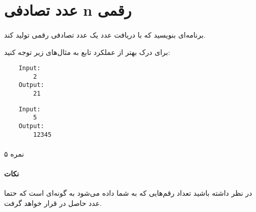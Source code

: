 \documentclass[../main.tex]{subfiles}
\begin{document}
\section{عدد تصادفی n رقمی}
\paragraph{}
برنامه‌ای بنویسید که با دریافت عدد
یک عدد تصادفی
رقمی تولید کند.

برای درک بهتر از عملکرد تابع به مثال‌های زیر توجه کنید:

\begin{latin}
\begin{verbatim}
    Input:
        2
    Output:
        21
\end{verbatim}

\begin{verbatim}
    Input:
        5
    Output:
        12345
\end{verbatim}
\end{latin}


\paragraph{}
۵ نمره

\paragraph{نکات}
در نظر داشته باشید تعداد رقم‌هایی که به شما داده می‌شود به گونه‌ای است که حتما عدد حاصل در
قرار خواهد گرفت.
\end{document}
